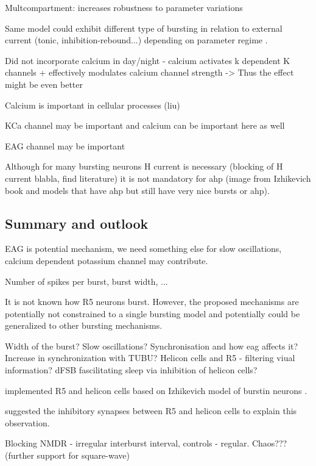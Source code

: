 \documentclass[../main.tex]{subfiles}
\begin{document}
Multcompartment: increases robustness to parameter variations

Same model could exhibit different type of bursting in relation to external current (tonic, inhibition-rebound...) depending on parameter regime \parencite{parkMathematicalModelSubthalamic2021}.



Did not incorporate calcium in day/night - calcium activates k dependent K channels + effectively modulates calcium channel strength -> Thus the effect might be even better

Calcium is important in cellular processes (liu)

KCa channel may be important and calcium can be important here as well

EAG channel may be important

Although for many bursting neurons H current is necessary (blocking of H current blabla, find literature)
it is not mandatory for \gls{ahp} (image from Izhikevich book and models that have ahp but still
have very nice bursts or ahp).

\subsection{Summary and outlook}

EAG is potential mechanism, we need something else for slow oscillations, calcium dependent potassium channel may contribute.

Number of spikes per burst, burst width, ...

It is not known how R5 neurons burst. However, the proposed mechanisms are potentially not constrained to a single bursting model and potentially could be generalized to other bursting mechanisms.

Width of the burst? Slow oscillations? Synchronisation and how eag affects it? Increase in synchronization with TUBU? Helicon cells and R5 - filtering viual information? dFSB fascilitating sleep via inhibition of helicon cells?

\parencite{krummSlowlyOscillatingBrain2021} implemented R5 and helicon cells based
on Izhikevich model of burstin neurons \parencite{izhikevichSimpleModelSpiking2003}.

\parencite{krummSlowlyOscillatingBrain2021} suggested the inhibitory synapses between R5 and
helicon cells to explain this observation.


Blocking NMDR - irregular interburst interval, controls - regular.
    Chaos??? (further support for square-wave)
    \parencite{raccugliaNetworkSpecificSynchronizationElectrical2019,izhikevichNEURALEXCITABILITYSPIKING2000}
\end{document}
